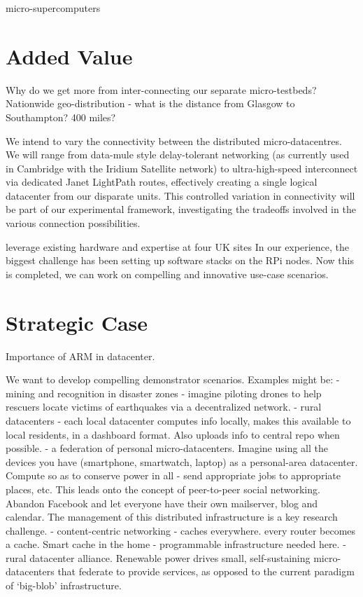 \documentclass[a4paper,11pt]{article}
\begin{document}
micro-supercomputers
\cite{cox2014iridis}


\section{Added Value}

Why do we get more from inter-connecting our separate micro-testbeds?
Nationwide geo-distribution - what is the distance from Glasgow to Southampton? 400 miles?

We intend to vary the connectivity between the distributed micro-datacentres. We will range from data-mule style delay-tolerant networking (as currently used in Cambridge with the Iridium Satellite network) to ultra-high-speed interconnect via dedicated Janet LightPath routes, effectively creating a single logical datacenter from our disparate units. 
This controlled variation in connectivity will be part of our experimental framework, investigating the tradeoffs involved in the various connection possibilities.

leverage existing hardware and expertise at four UK sites
In our experience, the biggest challenge has been setting up software stacks on the RPi nodes. Now this is completed, we can work on compelling and innovative use-case scenarios.





\section{Strategic Case}

Importance of ARM in datacenter.

We want to develop compelling demonstrator scenarios. Examples might be:
- mining and recognition in disaster zones - imagine piloting drones to help rescuers locate victims of earthquakes via a decentralized network.
- rural datacenters - each local datacenter computes info locally, makes this available to local residents, in a dashboard format. Also uploads info to central repo when possible.
- a federation of personal micro-datacenters. Imagine using all the devices you have (smartphone, smartwatch, laptop) as a personal-area datacenter. Compute so as to conserve power in all - send appropriate jobs to appropriate places, etc. This leads onto the concept of peer-to-peer social networking. Abandon Facebook and let everyone have their own mailserver, blog and calendar. The management of this distributed infrastructure is a key research challenge.
- content-centric networking - caches everywhere. every router becomes a cache. Smart cache in the home - programmable infrastructure needed here.
- rural datacenter alliance. Renewable power drives small, self-sustaining micro-datacenters that federate to provide services, as opposed to the current paradigm of `big-blob' infrastructure.
\end{document}
